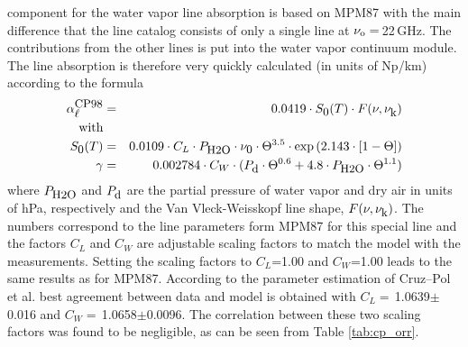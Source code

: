 {
\label{levele:cp98_h2oline}
component \citep{cruzpol:98} for the water vapor line absorption 
is based on MPM87 with the main difference that the 
line catalog consists of only a single line at $\nu_{\rm o}=$\,22\,GHz. 
The contributions from the other lines is put into the water vapor 
continuum module. The line absorption is therefore very quickly 
calculated (in units of Np/km) according to the formula
\begin{eqnarray}
  \label{eq:cp98:lineabs}
  \alphacpl &=& 0.0419 \cdot \intencp \cdot \shape \\
  \mbox{with} & & \nonumber\\
  \label{eq:cp98:inten}
  \intencp    &=& 0.0109 \cdot C_L \cdot \phzo \cdot \nuo \cdot \Theta^{3.5} 
             \cdot \exp{(2.143\cdot[1-\Theta])}\nonumber\\
%
  \label{eq:cp98:width}
  \gamma &=& 0.002784 \cdot C_W \cdot (\pda \cdot \Theta^{0.6}+ 
             4.8 \cdot \phzo \cdot \Theta^{1.1}) \nonumber\\
\end{eqnarray}
where $P_{\mbox{\rm \small H2O}}$ and $P_{\mbox{\rm \small d}}$ are the partial pressure of water vapor and dry
air in units of hPa, respectively and the Van Vleck-Weisskopf line
shape, $F(\nu,\nu_{\mbox{\rm \small k}})$. The numbers correspond to the line
parameters form MPM87 for this special line and the factors  
$C_L$ and $C_W$ are adjustable scaling factors to match the model with the
measurements. Setting the scaling factors to $C_L$=1.00 and $C_W$=1.00 
leads to the same results as for MPM87. According to the parameter 
estimation of Cruz--Pol et al. best agreement between 
data and model is obtained with $C_L=$\,1.0639$\pm$0.016 and 
$C_W=$\,1.0658$\pm$0.0096. The correlation between these two scaling 
factors was found to be negligible, as can be seen from 
Table \ref{tab:cp_orr}.

}

